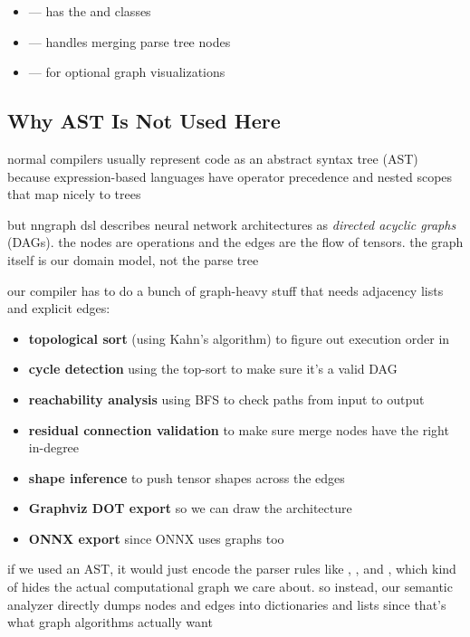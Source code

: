 \documentclass{nngraph-en}
\begin{document}
\begin{itemize}
    \item {} --- has the  and  classes
    \item {} --- handles merging parse tree nodes
    \item {} --- for optional graph visualizations
\end{itemize}

\subsection{Why AST Is Not Used Here}

normal compilers usually represent code as an abstract syntax tree (AST) because expression-based languages have operator precedence and nested scopes that map nicely to trees

but nngraph dsl describes neural network architectures as \emph{directed acyclic graphs} (DAGs). the nodes are operations and the edges are the flow of tensors. the graph itself is our domain model, not the parse tree

our compiler has to do a bunch of graph-heavy stuff that needs adjacency lists and explicit edges:

\begin{itemize}[noitemsep]
    \item \textbf{topological sort} (using Kahn's algorithm) to figure out execution order in 
    \item \textbf{cycle detection} using the top-sort to make sure it's a valid DAG
    \item \textbf{reachability analysis} using BFS to check paths from input to output
    \item \textbf{residual connection validation} to make sure merge nodes have the right in-degree
    \item \textbf{shape inference} to push tensor shapes across the edges
    \item \textbf{Graphviz DOT export} so we can draw the architecture
    \item \textbf{ONNX export} since ONNX uses graphs too
\end{itemize}

if we used an AST, it would just encode the parser rules like , , and , which kind of hides the actual computational graph we care about. so instead, our semantic analyzer directly dumps nodes and edges into dictionaries and lists since that's what graph algorithms actually want
\end{document}
